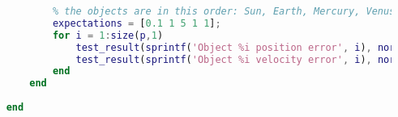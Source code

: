 \begin{lstlisting}[language=Matlab]
            % mercury is harder to simulate because it moves the fastest
            % the objects are in this order: Sun, Earth, Mercury, Venus, Mars
            expectations = [0.1 1 5 1 1];
            for i = 1:size(p,1)
                test_result(sprintf('Object %i position error', i), norm(final_p(i,:) - correct_p(i,:))/norm(correct_p(i,:))*100, '%', @le, expectations(i));
                test_result(sprintf('Object %i velocity error', i), norm(final_v(i,:) - correct_v(i,:))/norm(correct_v(i,:))*100, '%', @le, expectations(i));
            end  
        end
    
    end
\end{lstlisting}